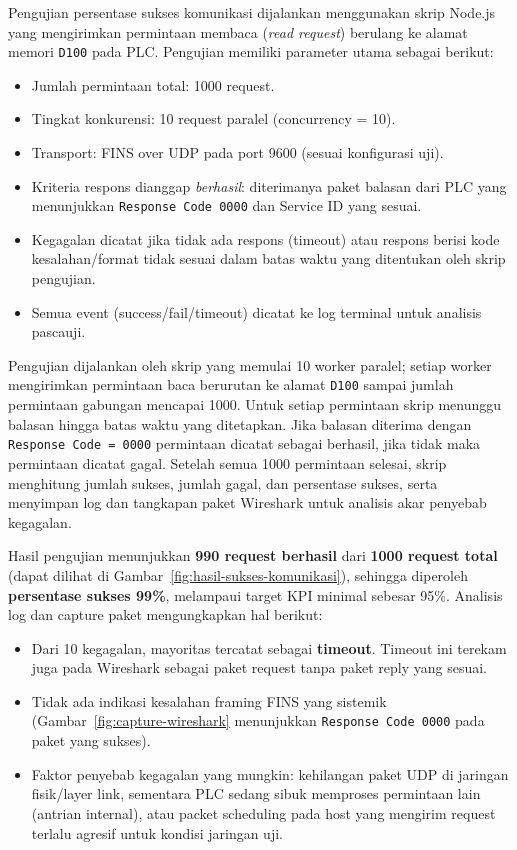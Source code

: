 Pengujian persentase sukses komunikasi dijalankan menggunakan skrip Node.js yang mengirimkan permintaan membaca (\textit{read request}) berulang ke alamat memori \texttt{D100} pada PLC. Pengujian memiliki parameter utama sebagai berikut:
\begin{itemize}
\item Jumlah permintaan total: 1000 request.
\item Tingkat konkurensi: 10 request paralel (concurrency = 10).
\item Transport: FINS over UDP pada port 9600 (sesuai konfigurasi uji).
\item Kriteria respons dianggap \emph{berhasil}: diterimanya paket balasan dari PLC yang menunjukkan \texttt{Response Code 0000} dan Service ID yang sesuai.
\item Kegagalan dicatat jika tidak ada respons (timeout) atau respons berisi kode kesalahan/format tidak sesuai dalam batas waktu yang ditentukan oleh skrip pengujian.
\item Semua event (success/fail/timeout) dicatat ke log terminal untuk analisis pascauji.
\end{itemize}

Pengujian dijalankan oleh skrip yang memulai 10 worker paralel; setiap worker mengirimkan permintaan baca berurutan ke alamat \texttt{D100} sampai jumlah permintaan gabungan mencapai 1000. Untuk setiap permintaan skrip menunggu balasan hingga batas waktu yang ditetapkan. Jika balasan diterima dengan \texttt{Response Code = 0000} permintaan dicatat sebagai berhasil, jika tidak maka permintaan dicatat gagal. Setelah semua 1000 permintaan selesai, skrip menghitung jumlah sukses, jumlah gagal, dan persentase sukses, serta menyimpan log dan tangkapan paket Wireshark untuk analisis akar penyebab kegagalan.

Hasil pengujian menunjukkan \textbf{990 request berhasil} dari \textbf{1000 request total} (dapat dilihat di Gambar~\ref{fig:hasil-sukses-komunikasi}), sehingga diperoleh \textbf{persentase sukses 99\%}, melampaui target KPI minimal sebesar 95\%. Analisis log dan capture paket mengungkapkan hal berikut:
\begin{itemize}
\item Dari 10 kegagalan, mayoritas tercatat sebagai \textbf{timeout}. Timeout ini terekam juga pada Wireshark sebagai paket request tanpa paket reply yang sesuai.
\item Tidak ada indikasi kesalahan framing FINS yang sistemik (Gambar~\ref{fig:capture-wireshark} menunjukkan \texttt{Response Code 0000} pada paket yang sukses).
\item Faktor penyebab kegagalan yang mungkin: kehilangan paket UDP di jaringan fisik/layer link, sementara PLC sedang sibuk memproses permintaan lain (antrian internal), atau packet scheduling pada host yang mengirim request terlalu agresif untuk kondisi jaringan uji.
\end{itemize}

